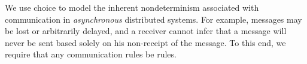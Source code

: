 We use choice to model the inherent nondeterminism associated with communication in {\em asynchronous} distributed systems.  For example, messages may be lost or arbitrarily delayed, and a receiver cannot infer that a message will never be sent based solely on his non-receipt of the message.  To this end, we require that any communication rules be  rules.


% 
% 





%
%



